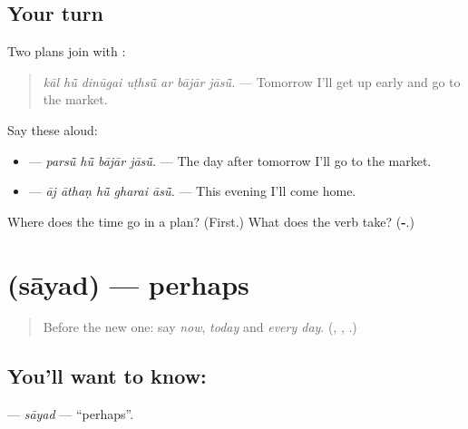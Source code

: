 \subsection*{Your turn}
Two plans join with \textbf{}:

\begin{quote}
\textbf{      }
\end{quote}

\begin{quote}
\emph{kāl hū̃ dinūgai uṭhsū̃ ar bājār jāsū̃.} — Tomorrow I'll get up early and go to the market.
\end{quote}

Say these aloud:

\begin{itemize}
\raggedright
  \item \textbf{   } — \emph{parsū̃ hū̃ bājār jāsū̃.} — The day after tomorrow I'll go to the market.
  \item \textbf{    } — \emph{āj āthaṇ hū̃ gharai āsū̃.} — This evening I'll come home.
\end{itemize}

\begin{tcolorbox}[breakable,colback=teal!4,colframe=teal!35!black,title={Before you move on}]
Where does the time go in a plan? (First.) What does the verb take? (\textbf{-}.)
\end{tcolorbox}
\section[\texorpdfstring{\mw{सायद} (sāyad)}{सायद (sāyad)}]{ (sāyad) — perhaps}

\label{lesson:MW-C163-sayad}



\begin{quote}
Before the new one: say \emph{now}, \emph{today} and \emph{every day}. (\textbf{}, \textbf{}, \textbf{}.)
\end{quote}

\subsection*{You'll want to know: }
\textbf{} — \emph{sāyad} — \textquotedblleft{}perhaps\textquotedblright{}.

\begin{quote}
\textbf{   }
\end{quote}

